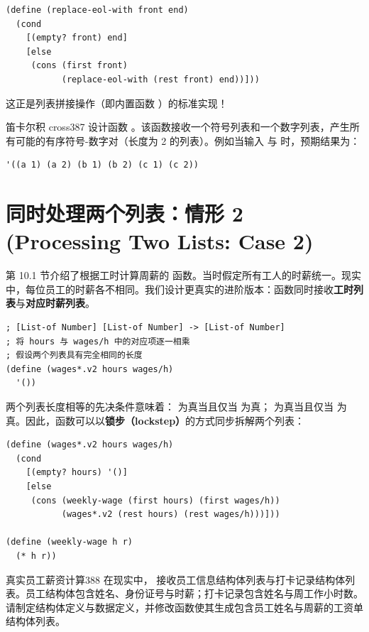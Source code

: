\begin{lstlisting}[language=BSL]
(define (replace-eol-with front end)
  (cond
    [(empty? front) end]
    [else
     (cons (first front)
           (replace-eol-with (rest front) end))]))
\end{lstlisting}

这正是列表拼接操作（即内置函数 ）的标准实现！

\begin{exercise}{笛卡尔积 cross}{387}
设计函数 。该函数接收一个符号列表和一个数字列表，产生所有可能的有序符号-数字对（长度为 2 的列表）。例如当输入  与  时，预期结果为：
\begin{lstlisting}[language=BSL]
'((a 1) (a 2) (b 1) (b 2) (c 1) (c 2))
\end{lstlisting}
\end{exercise}

\section{同时处理两个列表：情形 2 (Processing Two Lists: Case 2)}
\label{sec:23.2_case2}

第 10.1 节介绍了根据工时计算周薪的  函数。当时假定所有工人的时薪统一。现实中，每位员工的时薪各不相同。我们设计更真实的进阶版本：函数同时接收\textbf{工时列表}与\textbf{对应时薪列表}。

\begin{lstlisting}[language=BSL]
; [List-of Number] [List-of Number] -> [List-of Number]
; 将 hours 与 wages/h 中的对应项逐一相乘
; 假设两个列表具有完全相同的长度
(define (wages*.v2 hours wages/h)
  '())
\end{lstlisting}

两个列表长度相等的先决条件意味着： 为真当且仅当  为真； 为真当且仅当  为真。因此，函数可以以\textbf{锁步（lockstep）}的方式同步拆解两个列表：

\begin{lstlisting}[language=BSL]
(define (wages*.v2 hours wages/h)
  (cond
    [(empty? hours) '()]
    [else
     (cons (weekly-wage (first hours) (first wages/h))
           (wages*.v2 (rest hours) (rest wages/h)))]))

(define (weekly-wage h r)
  (* h r))
\end{lstlisting}

\begin{exercise}{真实员工薪资计算}{388}
在现实中， 接收员工信息结构体列表与打卡记录结构体列表。员工结构体包含姓名、身份证号与时薪；打卡记录包含姓名与周工作小时数。请制定结构体定义与数据定义，并修改函数使其生成包含员工姓名与周薪的工资单结构体列表。
\end{exercise}


